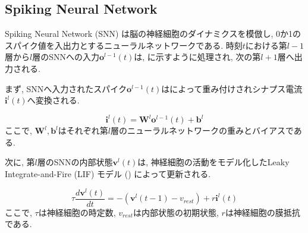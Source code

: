 \makeatletter %
\subsection{Spiking Neural Network}
Spiking Neural Network (SNN) は脳の神経細胞のダイナミクスを模倣し, 0か1のスパイク値を入出力とするニューラルネットワークである.
時刻$t$における第$l-1$層から$l$層のSNNへの入力$\bm{o}^{l-1}\left(t\right)$は, に示すように処理され, 次の第$l+1$層へ出力される.



まず, SNNへ入力されたスパイク$\bm{o}^{l-1}\left(t\right)$はによって重み付けされシナプス電流$\bm{i}^l\left(t\right)$へ変換される.

\begin{equation}
    \bm{i}^l\left(t\right) = \bm{W}^l\bm{o}^{l-1}\left(t\right) + \bm{b}^l
    \label{eq:input_spike}
\end{equation}
ここで, $\bm{W}^l, \bm{b}^l$はそれぞれ第$l$層のニューラルネットワークの重みとバイアスである.

次に, 第$l$層のSNNの内部状態$\bm{v}^l\left(t\right)$は, 神経細胞の活動をモデル化したLeaky Integrate-and-Fire (LIF) モデル () によって更新される.

\begin{equation}
    {\tau}\frac{d\bm{v}^l\left(t\right)}{dt}=-\left(\bm{v}^l\left({t-1}\right)-v_{rest}\right)+r\bm{i}^l\left(t\right)
    \label{eq:lif}
\end{equation}
ここで, $\tau$は神経細胞の時定数, $v_{rest}$は内部状態の初期状態, $r$は神経細胞の膜抵抗である.

